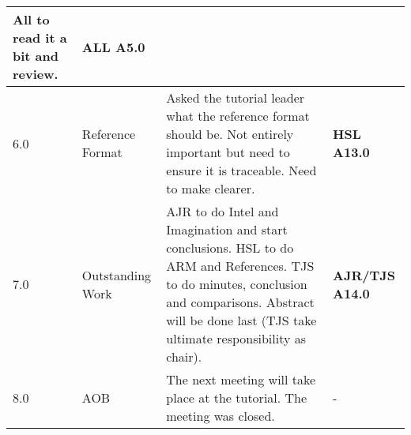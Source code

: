 \begin{center}
\begin{longtable}{| p{} |>{\raggedright\arraybackslash}p{} | p{} |>{\raggedright\arraybackslash}p{}|}
						All to read it a bit and review.															&  \textbf{ALL A5.0} \\ \hline
6.0	&	Reference Format	&	Asked the tutorial leader what the reference format should be. 
						Not entirely important but need to ensure it is traceable.
						Need to make clearer. 																&  \textbf{HSL A13.0} \\ \hline
7.0	&	Outstanding Work	&	AJR to do Intel and Imagination and start conclusions. 
						HSL to do ARM and References. 
						TJS to do minutes, conclusion and comparisons.
						Abstract will be done last (TJS take ultimate responsibility as chair).									&  \textbf{AJR/TJS A14.0} \\ \hline
8.0	&	AOB			&	The next meeting will take place at the tutorial. The meeting was closed. & - \\ \hline

\end{longtable}
\end{center}

